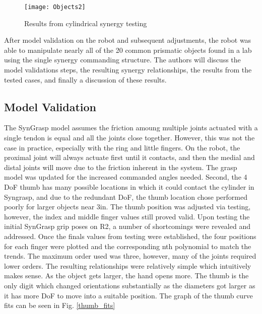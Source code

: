 \documentclass[letterpaper, 10 pt, conference]{ieeeconf}  %
\begin{document}
\begin{figure*}[t]
  \centering
  \texttt{[image: Objects2]}
  \caption{Results from cylindrical synergy testing}
  \label{objects} 
\end{figure*}

After model validation on the robot and subsequent adjustments, the robot was able to manipulate nearly all of the 20 common prismatic objects found in a lab using the single synergy commanding structure. The authors will discuss the model validations steps, the resulting synergy relationships, the results from the tested cases, and finally a discussion of these results.

\subsection{Model Validation}

The SynGrasp model assumes the friction amoung multiple joints actuated with a single tendon is equal and all the joints close together. However, this was not the case in practice, especially with the ring and little fingers. On the robot, the proximal joint will always actuate first until it contacts, and then the medial and distal joints will move due to the friction inherent in the system. The grasp model was updated for the increased commanded angles needed. Second, the 4 DoF thumb has many possible locations in which it could contact the cylinder in Syngrasp, and due to the redundant DoF, the thumb location chose performed poorly for larger objects near 3in. The thumb position was adjusted via testing, however, the index and middle finger values still proved valid.  Upon testing the initial SynGrasp grip poses on R2, a number of shortcomings were revealed and addressed. 
Once the finals values from testing were established, the four positions for each finger were plotted and the corresponding nth polynomial to match the trends. The maximum order used was three, however, many of the joints required lower orders. The resulting relationships were relatively simple which intuitively makes sense. As the object gets larger, the hand opens more. The thumb is the only digit which changed orientations substantially as the diameters got larger as it has more DoF to move into a suitable position. The graph of the thumb curve fits can be seen in Fig. \ref{thumb_fits}
\end{document}
